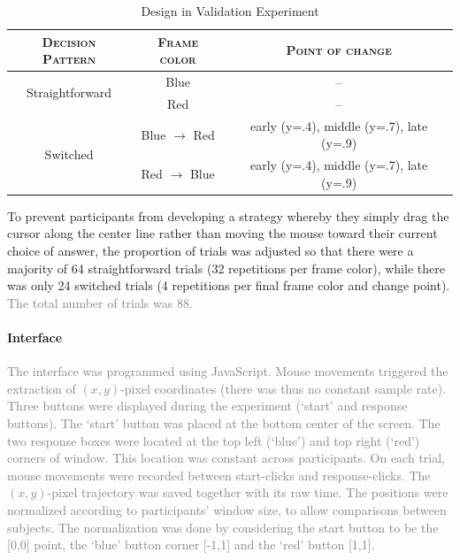 \documentclass[draft]{article}
\newcommand{\changeEC}[2]{{\footnotesize\textcolor{gray}{#1}}\textcolor{blue}{#2}}
\newcommand{\nbEC}[1]{{\leavevmode\color{blue}{\scriptsize#1}}}
\begin{document}
\begin{table}[!h]
\centering
\begin{tabular}{c|c|c}
\textsc{Decision Pattern}& \textsc{Frame color}&\textsc{Point of change}\\
\hline
\multirow{2}{*}{Straightforward} & Blue & -- \\
& Red & -- \\
\hline
\multirow{2}{*}{Switched} &Blue $\rightarrow$ Red & early (y=.4), middle (y=.7), late (y=.9) \\
 &  Red $\rightarrow$ Blue & early (y=.4), middle (y=.7), late (y=.9) \\
\hline
\end{tabular}
\caption{Design in Validation Experiment \nbEC{I am not sure this Table is needed. It is also not completely systematic. The second and third columns have different codes: in the second column the lines correspond to different options, in the third column it's the things between commas that correspond to different options. To put it differently, it's not easy to explain how to read that Table (although of course, it is eventually clear what it says)}}
\label{tab:design.validation}
\end{table}

To prevent participants from developing a strategy whereby they simply drag the cursor along the center line rather than moving the mouse toward their current choice of answer, the proportion of trials was adjusted so that there were a majority of 64 straightforward trials (32 repetitions per frame color), while there was only 24 switched trials (4 repetitions per final frame color and change point). \changeEC{The total number of trials was 88.  }{}

\paragraph{Interface}
\changeEC{The interface was programmed using JavaScript. Mouse movements triggered the extraction of $(x,y)$-pixel coordinates (there was thus no constant sample rate).
Three buttons were displayed during the experiment (`start' and response buttons). The `start' button was placed at the bottom center of the screen. The two response boxes were located at the top left (`blue') and top right (`red') corners of window. This location was constant across participants.
On each trial, mouse movements were recorded between start-clicks and response-clicks. The $(x,y)$-pixel trajectory was saved together with its raw time. The positions were normalized according to participants' window size, to allow comparisons between subjects. The normalization was done by considering the start button to be the [0,0] point, the `blue' button corner  [-1,1] and the `red' button  [1,1].   }{}
\end{document}
